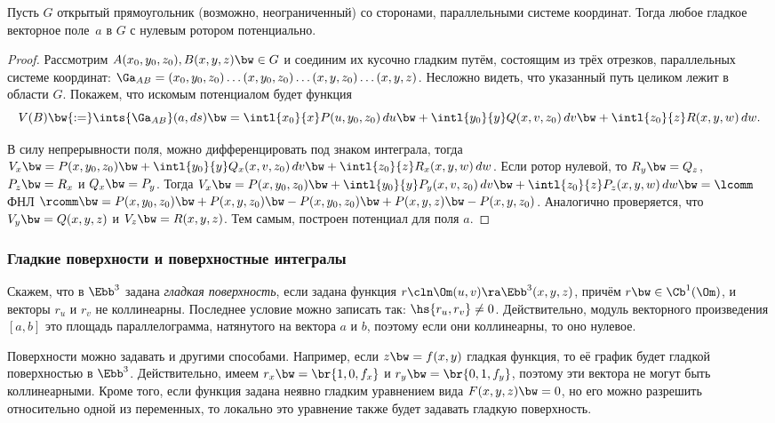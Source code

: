 \documentclass[a4paper]{article}
\begin{document}
\begin{theorem}
Пусть $G$ открытый прямоугольник (возможно, неограниченный) со сторонами, параллельными системе координат.
Тогда любое гладкое векторное поле~$a$ в $G$ с нулевым ротором потенциально.
\end{theorem}
\begin{proof}
Рассмотрим $A(x_0,y_0,z_0), B(x,y,z) \bw\in G$ и соединим их кусочно гладким путём, состоящим из трёх отрезков,
параллельных системе координат: $\Ga_{AB} =(x_0,y_0,z_0)\dots(x,y_0,z_0)\dots(x,y,z_0)\dots(x,y,z)$. Несложно видеть,
что указанный путь целиком лежит в области $G$. Покажем, что искомым потенциалом будет функция
$$V(B) \bw{:=} \ints{\Ga_{AB}}(a,ds) \bw= \intl{x_0}{x}P(u,y_0,z_0)\,du
\bw+ \intl{y_0}{y}Q(x,v,z_0)\,d v \bw+ \intl{z_0}{z}R(x,y,w)\,dw.$$

В силу непрерывности поля, можно дифференцировать под знаком интеграла, тогда $V_x \bw= P(x,y_0,z_0) \bw+
\intl{y_0}{y}Q_x(x,v,z_0)\,d v \bw+ \intl{z_0}{z}R_x(x,y,w)\,d w$. Если ротор нулевой, то $R_y\bw=Q_z$,
$P_z\bw=R_x$ и $Q_x \bw= P_y$. Тогда $V_x \bw= P(x,y_0,z_0) \bw+ \intl{y_0}{y}P_y(x,v,z_0)\,d v \bw+
\intl{z_0}{z}P_z(x,y,w) \,d w \bw= \lcomm$ ФНЛ $\rcomm \bw= P(x,y_0,z_0) \bw+ P(x,y,z_0)\bw-P(x,y_0,z_0) \bw+
P(x,y,z)\bw-P(x,y,z_0)$. Аналогично проверяется, что $V_y \bw= Q(x,y,z)$ и $V_z \bw= R(x,y,z)$.
Тем самым, построен потенциал для поля $a$.
\end{proof}

\subsubsection{Гладкие поверхности и поверхностные интегралы}

\begin{df}
Скажем, что в $\Ebb^3$ задана \emph{гладкая поверхность}, если задана функция
$r\cln \Om(u,v) \ra \Ebb^3(x,y,z)$, причём $r \bw\in \Cb^1(\Om)$, и
векторы $r_u$ и $r_v$ не коллинеарны. Последнее условие можно записать так: $\hs{r_u, r_v} \neq 0$.
Действительно, модуль векторного произведения $[a,b]$ это площадь параллелограмма, натянутого
на вектора $a$ и $b$, поэтому если они коллинеарны, то оно нулевое.
\end{df}

Поверхности можно задавать и другими способами. Например, если $z \bw= f(x,y)$ гладкая функция,
то её график будет гладкой поверхностью в $\Ebb^3$. Действительно, имеем
$r_x \bw= \br{1, 0, f_x}$ и $r_y \bw= \br{0, 1, f_y}$, поэтому эти вектора не могут быть коллинеарными.
Кроме того, если функция задана неявно гладким уравнением вида $F(x,y,z)\bw= 0$, но его можно
разрешить относительно одной из переменных,
то локально это уравнение также будет задавать гладкую поверхность.
\end{document}
